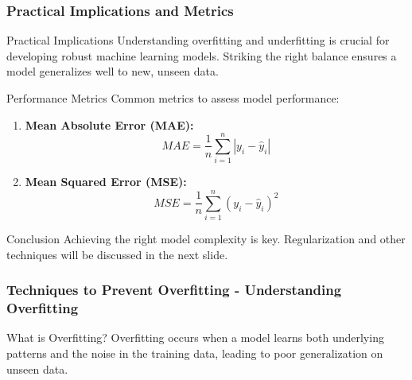 \documentclass[aspectratio=169]{beamer}
\begin{document}
\begin{frame}[fragile]
    \frametitle{Practical Implications and Metrics}
    \begin{block}{Practical Implications}
        Understanding overfitting and underfitting is crucial for developing robust machine learning models. Striking the right balance ensures a model generalizes well to new, unseen data.
    \end{block}

    \begin{block}{Performance Metrics}
        Common metrics to assess model performance:
        \begin{enumerate}
            \item \textbf{Mean Absolute Error (MAE):} 
            \begin{equation}
                MAE = \frac{1}{n} \sum_{i=1}^{n} |y_i - \hat{y}_i|
            \end{equation}
            \item \textbf{Mean Squared Error (MSE):} 
            \begin{equation}
                MSE = \frac{1}{n} \sum_{i=1}^{n} (y_i - \hat{y}_i)^2
            \end{equation}
        \end{enumerate}
    \end{block}
    
    \begin{block}{Conclusion}
        Achieving the right model complexity is key. Regularization and other techniques will be discussed in the next slide.
    \end{block}
\end{frame}

\begin{frame}[fragile]
    \frametitle{Techniques to Prevent Overfitting - Understanding Overfitting}
    \begin{block}{What is Overfitting?}
        Overfitting occurs when a model learns both underlying patterns and the noise in the training data, leading to poor generalization on unseen data.
    \end{block}
\end{frame}
\end{document}
